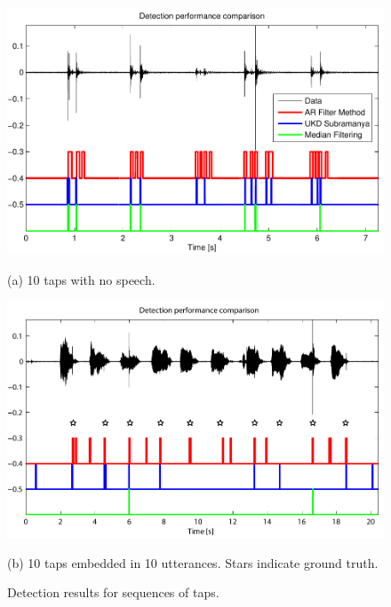 \begin{figure}
\begin{minipage}[b]{1.0\linewidth}
  \centering
  \centerline{\includegraphics[width=12.5cm]{ARFiltCompareLongTaps.pdf}}
  \centerline{(a) 10 taps with no speech.}\medskip
\end{minipage}
%
\begin{minipage}[b]{1.0\linewidth}
  \centering
  \centerline{\includegraphics[width=12.5cm]{ARFiltCompareLongTapsnTalk.pdf}}
  \centerline{(b) 10 taps embedded in 10 utterances. Stars indicate ground truth.}\medskip
\end{minipage}
\hfill
%
\caption{Detection results for sequences of taps.}
\label{fig:ARFilterDetectionResults}
\end{figure}

